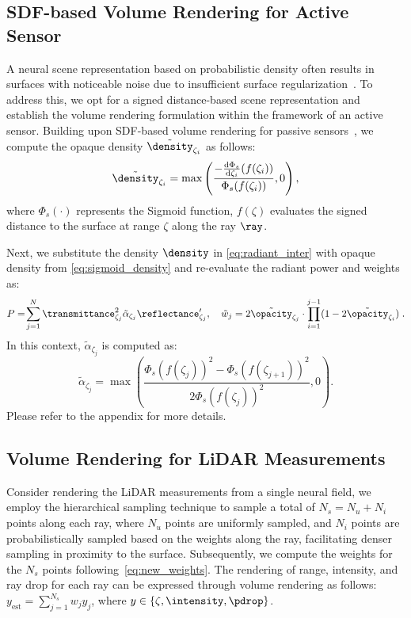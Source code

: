 \subsection{SDF-based Volume Rendering for Active Sensor} 
\label{sec:sdf_vol_render}
A neural scene representation based on probabilistic density often results in surfaces with noticeable noise due to insufficient surface regularization~\cite{wang2021neus}. To address this, we opt for a signed distance-based scene representation and establish the volume rendering formulation within the framework of an active sensor. Building upon SDF-based volume rendering for passive sensors~\cite{wang2021neus}, we compute the opaque density $\tilde{\density}_{\zeta_i}$ as follows:
\begin{equation}
\tilde{\density}_{\zeta_i} = \max\left(\frac{-\frac{{\textrm{d}}\Phi_s}{{\textrm{d}} \zeta_i}(f(\zeta_i))}{\Phi_s(f(\zeta_i))},0\right),
\label{eq:sigmoid_density}
\end{equation}
where $\Phi_s(\cdot)$ represents the Sigmoid function, $f(\zeta)$ evaluates the signed distance to the surface at range $\zeta$ along the ray $\ray$. 

Next, we substitute the density $\density$ in \cref{eq:radiant_inter} with opaque density from \cref{eq:sigmoid_density} and re-evaluate the radiant power and weights as:
\begin{equation}
      P
      =\!\sum_{j=1}^N \transmittance^2_{\zeta_j} \tilde{\alpha}_{\zeta_j} \reflectance_{\zeta_j}',\quad \tilde{w}_j = 2 \tilde{\opacity}_{\zeta_j} \cdot\prod_{i=1}^{j-1}(1 - 2 \tilde{\opacity}_{\zeta_i})\;.
\end{equation}
In this context, $\tilde{\alpha}_{\zeta_j}$ is computed as:
\begin{equation}
    \tilde{\alpha}_{\zeta_j} = \max\left(\!\frac{{\Phi_s(f(\zeta_j))}^2 -{\Phi_s(f(\zeta_{j+1}))}^2}{{2\Phi_s(f(\zeta_j))}^2},0\right).
    \label{eq:new_weights}
\end{equation}
Please refer to the appendix for more details.


\subsection{Volume Rendering for LiDAR Measurements}
\label{sec:dynamic_nfl_rendering}
Consider rendering the LiDAR measurements from a single neural field, we employ the hierarchical sampling\cite{wang2021neus} technique to sample a total of $N_s= N_u + N_i$ points along each ray, where $N_u$ points are uniformly sampled, and $N_i$ points are probabilistically sampled based on the weights along the ray, facilitating denser sampling in proximity to the surface. Subsequently, we compute the weights for the $N_s$ points following~\cref{eq:new_weights}. The rendering of range, intensity, and ray drop for each ray can be expressed through volume rendering as follows: $y_\text{est} = \sum_{j=1}^{N_s} w_j y_j$, where $y \in \{\zeta, \intensity, \pdrop\}$.


